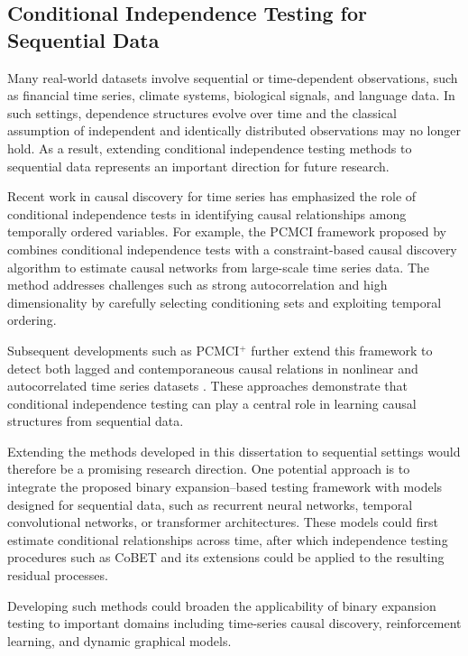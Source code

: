\documentclass[12pt,reqno,oneside]{amsbook}
\theoremstyle{definition}
\theoremstyle{remark}
\begin{document}
\subsection{Conditional Independence Testing for Sequential Data}

Many real-world datasets involve sequential or time-dependent observations, such as financial time series, climate systems, biological signals, and language data. In such settings, dependence structures evolve over time and the classical assumption of independent and identically distributed observations may no longer hold. As a result, extending conditional independence testing methods to sequential data represents an important direction for future research.

Recent work in causal discovery for time series has emphasized the role of conditional independence tests in identifying causal relationships among temporally ordered variables. For example, the PCMCI framework proposed by \citet{runge2019detecting} combines conditional independence tests with a constraint-based causal discovery algorithm to estimate causal networks from large-scale time series data. The method addresses challenges such as strong autocorrelation and high dimensionality by carefully selecting conditioning sets and exploiting temporal ordering.

Subsequent developments such as PCMCI$^{+}$ further extend this framework to detect both lagged and contemporaneous causal relations in nonlinear and autocorrelated time series datasets \citep{runge2020discovering}. These approaches demonstrate that conditional independence testing can play a central role in learning causal structures from sequential data.

Extending the methods developed in this dissertation to sequential settings would therefore be a promising research direction. One potential approach is to integrate the proposed binary expansion–based testing framework with models designed for sequential data, such as recurrent neural networks, temporal convolutional networks, or transformer architectures. These models could first estimate conditional relationships across time, after which independence testing procedures such as CoBET and its extensions could be applied to the resulting residual processes.

Developing such methods could broaden the applicability of binary expansion testing to important domains including time-series causal discovery, reinforcement learning, and dynamic graphical models.
\end{document}
